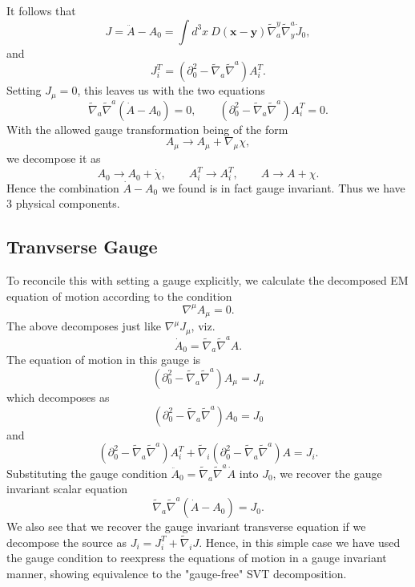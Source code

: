 \documentclass[10pt,letterpaper]{article}
\numberwithin{equation}{subsection}
\begin{document}
It follows that
\begin{equation}
J = \ddot A - A_0 =\int d^3x \ D(\mathbf x - \mathbf y) \tilde\nabla_a^y \tilde\nabla^a_y \dot J_0,
\end{equation}
and 
\begin{equation}
J_i^T =  \left(\partial_0^2 - \tilde\nabla_a\tilde\nabla^a\right)A_i^T.
\end{equation}
Setting $J_\mu = 0$, this leaves us with the two equations
\begin{equation}
\boxed{
\tilde\nabla_a \tilde\nabla^a \left(\dot A - A_0\right) = 0,\qquad   \left(\partial_0^2 - \tilde\nabla_a\tilde\nabla^a\right)A_i^T=0.}
\end{equation}
With the allowed gauge transformation being of the form
\begin{equation}
A_{\mu} \to A_{\mu} + \nabla_\mu \chi,
\end{equation}
we decompose it as
\begin{equation}
A_0 \to A_0 + \dot \chi,\qquad A^T_i \to A^T_i,\qquad A \to A + \chi.
\end{equation}
Hence the combination $\dot A - A_0$ we found is in fact gauge invariant. Thus we have 3 physical components. 
\subsection{Tranvserse Gauge}
To reconcile this with setting a gauge explicitly, we calculate the decomposed EM equation of motion according to the condition
\begin{equation}
	\nabla^\mu A_\mu = 0.
\end{equation}
The above decomposes just like $\nabla^\mu J_{\mu}$, viz.
\begin{equation}
\dot A_0 = \tilde\nabla_a \tilde\nabla^a A.
\end{equation}
The equation of motion in this gauge is 
\begin{equation}
 \left(\partial_0^2 - \tilde\nabla_a\tilde\nabla^a\right)A_\mu=J_{\mu}
\end{equation}
which decomposes as
\begin{equation}
 \left(\partial_0^2 - \tilde\nabla_a\tilde\nabla^a\right)A_0=J_{0}
\end{equation}
and
\begin{equation}
 \left(\partial_0^2 - \tilde\nabla_a\tilde\nabla^a\right)A_i^T +  \tilde\nabla_i\left(\partial_0^2 - \tilde\nabla_a\tilde\nabla^a\right)A=J_i.
\end{equation}
Substituting the gauge condition $\ddot A_0 = \tilde\nabla_a\tilde\nabla^a \dot A$ into $J_0$, we recover the gauge invariant scalar equation
\begin{equation}
\tilde\nabla_a \tilde\nabla^a \left(\dot A - A_0\right) = J_0.
\end{equation}
We also see that we recover the gauge invariant transverse equation if we decompose the source as $J_i = J_i^T + \tilde\nabla_i J$. Hence, in this simple case we have used the gauge condition to reexpress the equations of motion in a gauge invariant manner, showing equivalence to the "gauge-free" SVT decomposition.
\end{document}
